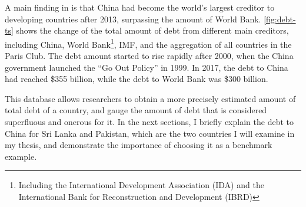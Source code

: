 A main finding in \citet*{Horn-Reinhart-Trebesch-21} is that China had become the world's largest creditor to developing countries after 2013, surpassing the amount of World Bank. \autoref{fig:debt-ts} shows the change of the total amount of debt from different main creditors, including China, World Bank\footnote{Including the International Development Association (IDA) and the International Bank for Reconstruction and Development (IBRD) }, IMF, and the aggregation of all countries in the Paris Club. The debt amount started to rise rapidly after 2000, when the China government launched the ``Go Out Policy'' in 1999. In 2017, the debt to China had reached \$355 billion, while the debt to World Bank was \$300 billion.

This database allows researchers to obtain a more precisely estimated amount of total debt of a country, and gauge the amount of debt that is considered superfluous and onerous for it.
In the next sections, I briefly explain the debt to China for Sri Lanka and Pakistan, which are the two countries I will examine in my thesis, and demonstrate the importance of choosing it as a benchmark example.